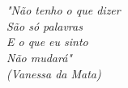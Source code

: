 
\chapter*{}
\begin{flushright}		
\vfill	

%

\it "Não tenho o que dizer \\ São só palavras \\
E o que eu sinto \\ Não mudará" \\ (Vanessa da Mata)


\vspace*{1em}

\it {}  
\it {}  


\end{flushright}
